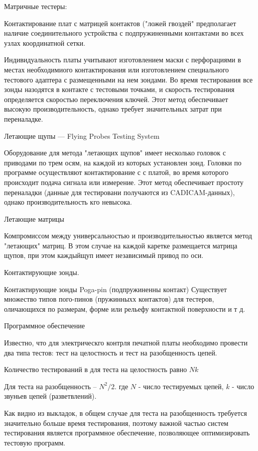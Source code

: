 \documentclass{article}
\begin{document}
Матричные тестеры:

Контактирование плат с матрицей контактов ("ложей гвоздей" предполагает наличие соединительного устройства с подпружиненными контактами во всех узлах координатной сетки.

Индивидуальность платы учитывают изготовлением маски с перфорациями в местах необходимиого контактирования или изготовлением специального тестового адаптера с размещенными на нем зондами. Во время тестирования все зонды назодятся в контакте с тестовыми точками, и скорость тестирования определяется скоростью переключения ключей. Этот метод обеспечивает высокую производительность, однако требует значительных затрат при переналадке.

Летающие щупы --- Flying Probes Testing System

Оборудование для метода "летающих щупов" имеет несколько головок с приводами по трем осям, на каждой из которых установлен зонд. Головки по программе осуществляют контактирование с с платой, во время которого происходит подача сигнала или измерение. Этот метод обеспечивает простоту переналадки (данные для тестировани получаются из CADICAM-данных), однако производительность кго невысока.

Летающие матрицы

Компромиссом между универсальностью и производительностью является метод "летающих" матриц. В этом случае на каждой каретке размещается матрица щупов, при этом каждыйщуп имеет независимый привод по оси.

Контактирующие зонды.

Контактирующие зонды
Poga-pin (подпружиненны	 контакт)
Существует множество типов пого-пинов (пружинныхх контактов) для тестеров, оличающихся по размерам, форме или рельефу контактной поверхности и т д.

Программное обеспечение

Известно, что для электрическго контрля печатной платы необходимо провести два типа тестов: тест на целостность и тест на разобщенность цепей.

Количество тестирований в для теста на целостность равно $N k$

Для теста на разобщенность -- $N^2/2$.
где $N$ - число тестируемых цепей, $k$ - число звуньев цепей (разветвлений).

Как видно из выкладок, в общем случае для теста на разобщенность требуется значительно больше время тестирования, поэтому важной частью систем тестирования является программное обеспечение, позволяющее оптимизировать тестовую программ.
\end{document}
